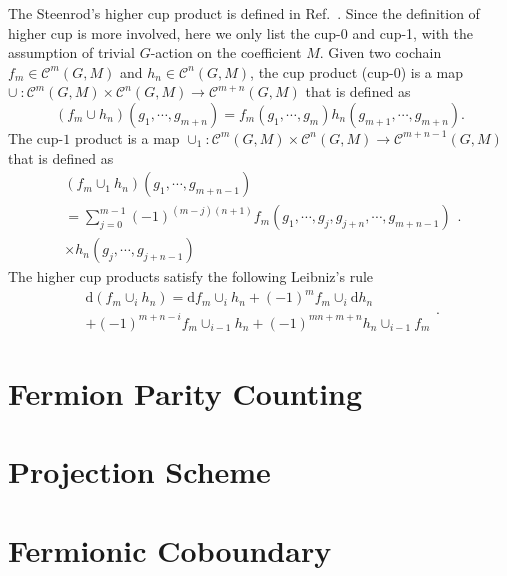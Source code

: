 \documentclass[%
 reprint,
 amsmath,amssymb,
 aps,
prb,
]{revtex4-2}
\begin{document}
The Steenrod's higher cup product is defined in Ref.~\cite{Steen1974}. Since the definition of higher cup is more involved, here we only list the cup-0 and cup-1, with the assumption of trivial $G$-action on the coefficient $M$. Given two cochain $f_{m} \in \mathcal{C}^{m}( G,M)$ and $h_{n} \in \mathcal{C}^{n}( G,M)$, the cup product (cup-0) is a map $\cup \ :\mathcal{C}^{m}( G,M) \times \mathcal{C}^{n}( G,M) \rightarrow \mathcal{C}^{m+n}( G,M)$ that is defined as 
\begin{equation}
( f_{m} \cup h_{n})( g_{1} ,\cdots ,g_{m+n}) =f_{m}( g_{1} ,\cdots ,g_{m}) h_{n}( g_{m+1} ,\cdots ,g_{m+n}) . \label{eq.ap1.10}
\end{equation}
The cup-$1$ product is a map $\cup_{1} :\mathcal{C}^{m}( G,M) \times \mathcal{C}^{n}( G,M) \rightarrow \mathcal{C}^{m+n-1}( G,M)$ that is defined as 
\begin{equation}
\begin{array}{ l }
( f_{m} \cup _{1} h_{n})( g_{1} ,\cdots ,g_{m+n-1})\\
=\sum _{j=0}^{m-1}( -1)^{( m-j)( n+1)} f_{m}( g_{1} ,\cdots ,g_{j} ,g_{j+n} ,\cdots ,g_{m+n-1})\\
\times h_{n}( g_{j} ,\cdots ,g_{j+n-1})
\end{array} . \label{eq.ap1.11}
\end{equation}
The higher cup products satisfy the following Leibniz's rule 
\begin{equation}
\begin{array}{ l }
\mathrm{d}( f_{m} \cup _{i} h_{n}) =\mathrm{d} f_{m} \cup _{i} h_{n} +( -1)^{m} f_{m} \cup _{i}\mathrm{d} h_{n}\\
+( -1)^{m+n-i} f_{m} \cup _{i-1} h_{n} +( -1)^{mn+m+n} h_{n} \cup _{i-1} f_{m}
\end{array} . \label{eq.ap1.12}
\end{equation}


\section{\label{ap:fermion parity}Fermion Parity Counting}

\section{\label{ap:projection scheme}Projection Scheme}

\section{\label{ap:fermionic coboundary}Fermionic Coboundary}
\end{document}
